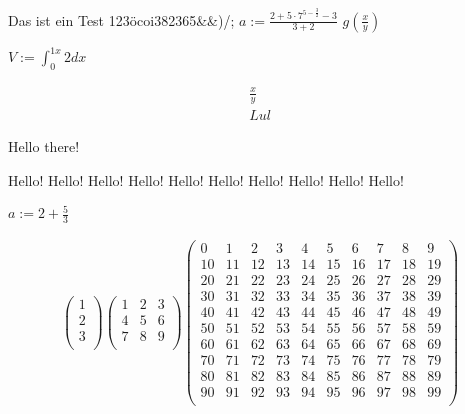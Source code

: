% 
%
\usepackage{amsmath}
\usepackage{test}

\test{}

Das ist ein Test 123öcoi382365&&)/;
$a:=\frac{2+5 \cdot{} 7^{5-\frac{3}{2}}-3}{3+2}$
$g(\frac{x}{y})$

$V := \int_{0}^{1 x}2dx$

\begin{align}
    \frac{x}{y}\\
    Lul
\end{align}

Hello there!

Hello!
Hello!
Hello!
Hello!
Hello!
Hello!
Hello!
Hello!
Hello!
Hello!


$a:=2+\frac{5}{3}$

\begin{align}
    \begin{pmatrix}
1\\
2\\
3\\
\end{pmatrix}
\begin{pmatrix}
1 & 2 & 3\\
4 & 5 & 6\\
7 & 8 & 9\\
\end{pmatrix}
\begin{pmatrix}
0 & 1 & 2 & 3 & 4 & 5 & 6 & 7 & 8 & 9\\
10 & 11 & 12 & 13 & 14 & 15 & 16 & 17 & 18 & 19\\
20 & 21 & 22 & 23 & 24 & 25 & 26 & 27 & 28 & 29\\
30 & 31 & 32 & 33 & 34 & 35 & 36 & 37 & 38 & 39\\
40 & 41 & 42 & 43 & 44 & 45 & 46 & 47 & 48 & 49\\
50 & 51 & 52 & 53 & 54 & 55 & 56 & 57 & 58 & 59\\
60 & 61 & 62 & 63 & 64 & 65 & 66 & 67 & 68 & 69\\
70 & 71 & 72 & 73 & 74 & 75 & 76 & 77 & 78 & 79\\
80 & 81 & 82 & 83 & 84 & 85 & 86 & 87 & 88 & 89\\
90 & 91 & 92 & 93 & 94 & 95 & 96 & 97 & 98 & 99\\
\end{pmatrix}

\end{align}



